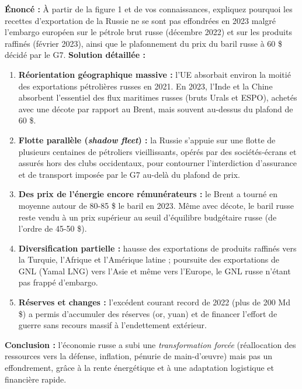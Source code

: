 \documentclass[11pt]{article}
\begin{document}
\begin{exoresolu}
\textbf{Énoncé :} À partir de la figure 1 et de vos connaissances, expliquez pourquoi les recettes d'exportation de la Russie ne se sont pas effondrées en 2023 malgré l'embargo européen sur le pétrole brut russe (décembre 2022) et sur les produits raffinés (février 2023), ainsi que le plafonnement du prix du baril russe à 60 \$ décidé par le G7.
\tcblower
\textbf{Solution détaillée :}
\begin{enumerate}
    \item \textbf{Réorientation géographique massive :} l'UE absorbait environ la moitié des exportations pétrolières russes en 2021. En 2023, l'Inde et la Chine absorbent l'essentiel des flux maritimes russes (bruts Urals et ESPO), achetés avec une décote par rapport au Brent, mais souvent au-dessus du plafond de 60 \$.
    \item \textbf{Flotte parallèle (\emph{shadow fleet}) :} la Russie s'appuie sur une flotte de plusieurs centaines de pétroliers vieillissants, opérés par des sociétés-écrans et assurés hors des clubs occidentaux, pour contourner l'interdiction d'assurance et de transport imposée par le G7 au-delà du plafond de prix.
    \item \textbf{Des prix de l'énergie encore rémunérateurs :} le Brent a tourné en moyenne autour de 80-85 \$ le baril en 2023. Même avec décote, le baril russe reste vendu à un prix supérieur au seuil d'équilibre budgétaire russe (de l'ordre de 45-50 \$).
    \item \textbf{Diversification partielle :} hausse des exportations de produits raffinés vers la Turquie, l'Afrique et l'Amérique latine ; poursuite des exportations de GNL (Yamal LNG) vers l'Asie et même vers l'Europe, le GNL russe n'étant pas frappé d'embargo.
    \item \textbf{Réserves et changes :} l'excédent courant record de 2022 (plus de 200 Md \$) a permis d'accumuler des réserves (or, yuan) et de financer l'effort de guerre sans recours massif à l'endettement extérieur.
\end{enumerate}
\textbf{Conclusion :} l'économie russe a subi une \emph{transformation forcée} (réallocation des ressources vers la défense, inflation, pénurie de main-d'œuvre) mais pas un effondrement, grâce à la rente énergétique et à une adaptation logistique et financière rapide.
\end{exoresolu}
\end{document}

